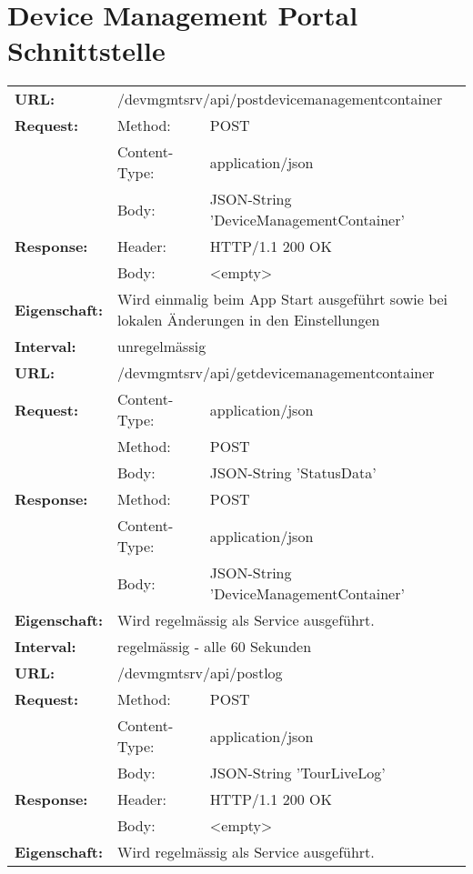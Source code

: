 \section{Device Management Portal Schnittstelle}
{\renewcommand{\arraystretch}{1}
    \begin{longtable}{ p{2.5cm} p{3.5cm} p{6cm}}
	\textbf{URL:} & \multicolumn{2}{l}{/devmgmtsrv/api/postdevicemanagementcontainer} \\
	\textbf{Request:} & Method: & POST \\
		& Content-Type: & application/json \\
		& Body: & JSON-String 'DeviceManagementContainer'\\
	\textbf{Response:} &  Header: & HTTP/1.1 200 OK \\
		& Body: & <empty>	\\
	\textbf{Eigenschaft:} & \multicolumn{2}{p{10cm}}{Wird einmalig beim App Start ausgeführt sowie bei lokalen Änderungen in den Einstellungen} \\
	\textbf{Interval:} & \multicolumn{2}{p{10cm}}{unregelmässig} \\
\hline
\hline    
	\textbf{URL:} & \multicolumn{2}{l}{/devmgmtsrv/api/getdevicemanagementcontainer} \\
	\textbf{Request:} & Content-Type: & application/json \\
		& Method: & POST \\
		& Body: & JSON-String 'StatusData' \\
	\textbf{Response:} & Method: & POST \\
		& Content-Type: & application/json \\
		& Body: & JSON-String 'DeviceManagementContainer' \\
	\textbf{Eigenschaft:} & \multicolumn{2}{p{10cm}}{Wird regelmässig als Service ausgeführt.} \\ 
	\textbf{Interval:} & \multicolumn{2}{p{10cm}}{regelmässig - alle 60 Sekunden} \\
\hline
\hline    
	\textbf{URL:} & \multicolumn{2}{p{10cm}}{/devmgmtsrv/api/postlog} \\
	\textbf{Request:} & Method: & POST \\
		& Content-Type: & application/json \\
		& Body: & JSON-String 'TourLiveLog' \\
	\textbf{Response:} &  Header: & HTTP/1.1 200 OK \\
		& Body: & <empty>	\\
	\textbf{Eigenschaft:} &  \multicolumn{2}{p{10cm}}{Wird regelmässig als Service ausgeführt.}\\ 

\end{longtable}}
